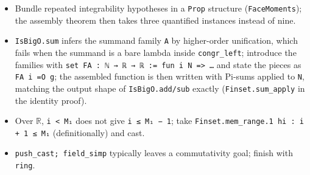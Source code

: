 \documentclass[11pt]{article}
\begin{document}
\begin{itemize}
\item Bundle repeated integrability hypotheses in a \texttt{Prop} structure
(\texttt{FaceMoments}); the assembly theorem then takes three quantified instances instead of nine.
\item \texttt{IsBigO.sum} infers the summand family \texttt{A} by higher-order unification, which
fails when the summand is a bare lambda inside \texttt{congr\_left}; introduce the families with
\texttt{set FA : ℕ → ℝ → ℝ := fun i N => …} and state the pieces as \texttt{FA i =O g}; the
assembled function is then written with Pi-sums applied to \texttt{N}, matching the output shape
of \texttt{IsBigO.add/sub} exactly (\texttt{Finset.sum\_apply} in the identity proof).
\item Over $\mathbb R$, \texttt{i < M₁} does not give \texttt{i ≤ M₁ − 1}; take
\texttt{Finset.mem\_range.1 hi : i + 1 ≤ M₁} (definitionally) and cast.
\item \texttt{push\_cast; field\_simp} typically leaves a commutativity goal; finish with
\texttt{ring}.
\end{itemize}
\end{document}
